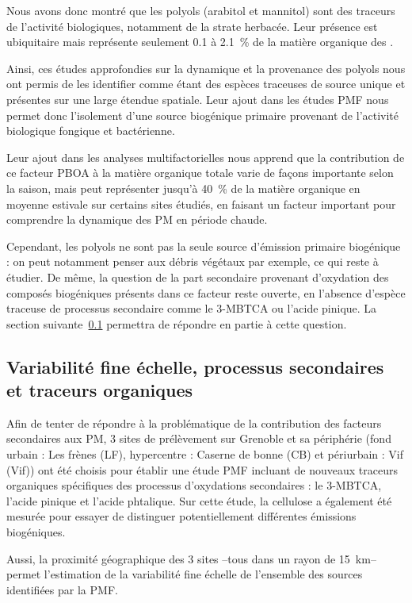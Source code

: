 Nous avons donc montré que les polyols (arabitol et mannitol) sont des traceurs de
l'activité biologiques, notamment de la strate herbacée. Leur présence est ubiquitaire
mais représente seulement 0.1 à \SI{2.1}{\percent} de la matière organique des \PMdix.

Ainsi, ces études approfondies sur la dynamique et la provenance des polyols nous ont
permis de les identifier comme étant des espèces traceuses de source unique et présentes
sur une large étendue spatiale. Leur ajout dans les études PMF nous permet donc
l'isolement d'une source biogénique primaire provenant de l'activité biologique fongique
et bactérienne.

Leur ajout dans les analyses multifactorielles nous apprend que la contribution de ce
facteur PBOA à la matière organique totale varie de façons importante selon la saison,
mais peut représenter jusqu'à \SI{40}{\percent} de la matière organique en moyenne
estivale sur certains sites étudiés, en faisant un facteur important pour comprendre la
dynamique des PM en période chaude.

Cependant, les polyols ne sont pas la seule source d'émission primaire biogénique : on
peut notamment penser aux débris végétaux par exemple, ce qui reste à étudier. De même,
la question de la part secondaire provenant d'oxydation des composés biogéniques présents
dans ce facteur reste ouverte, en l'absence d'espèce traceuse de processus secondaire
comme le 3-MBTCA ou l'acide pinique. La section suivante~\ref{sub:processus_secondaires}
permettra de répondre en partie à cette question.

\subsection{Variabilité fine échelle, processus secondaires et traceurs organiques}%
\label{sub:processus_secondaires}

Afin de tenter de répondre à la problématique de la contribution des facteurs secondaires
aux PM, 3 sites de prélèvement sur Grenoble et sa périphérie (fond urbain : Les frènes
(LF), hypercentre : Caserne de bonne (CB) et périurbain : Vif (Vif)) ont été choisis pour
établir une étude PMF incluant de nouveaux traceurs organiques spécifiques des processus
d'oxydations secondaires : le 3-MBTCA, l'acide pinique et l'acide phtalique. Sur cette
étude, la cellulose a également été mesurée pour essayer de distinguer potentiellement
différentes émissions biogéniques.

Aussi, la proximité géographique des 3 sites --tous dans un rayon de \SI{15}{\kilo\m}--
permet l'estimation de la variabilité fine échelle de l'ensemble des sources identifiées
par la PMF.

